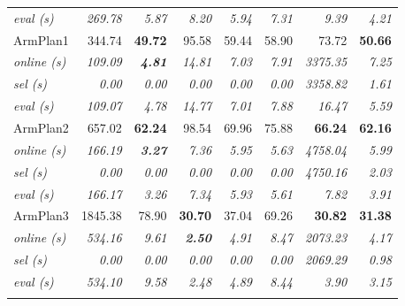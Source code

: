 \begin{figure}[t!]
{{\begin{tabular}{lrrrrrrr}
         \;\;\;\;\emph{eval (s)} & \emph{269.78} & \emph{5.87} & \emph{8.20} & \emph{5.94} & \emph{7.31} & \emph{9.39} & \emph{4.21} \\
         \addlinespace[0.3em]
         ArmPlan1 &  344.74 & \textbf{49.72} & 95.58 & 59.44 & 58.90 & 73.72 & \textbf{50.66} \\
         \;\;\emph{online (s)} & \emph{109.09} & \bf\emph{4.81} & \emph{14.81} & \emph{7.03} & \emph{7.91} & \emph{3375.35} & \emph{7.25} \\
         \;\;\;\;\emph{sel (s)} & \emph{0.00} & \emph{0.00} & \emph{0.00} & \emph{0.00} & \emph{0.00} & \emph{3358.82} & \emph{1.61} \\
         \;\;\;\;\emph{eval (s)} & \emph{109.07} & \emph{4.78} & \emph{14.77} & \emph{7.01} & \emph{7.88} & \emph{16.47} & \emph{5.59} \\
         \addlinespace[0.3em]
         ArmPlan2 &  657.02 & \textbf{62.24} & 98.54 & 69.96 & 75.88 & \textbf{66.24} & \textbf{62.16} \\
         \;\;\emph{online (s)} & \emph{166.19} & \bf\emph{3.27} & \emph{7.36} & \emph{5.95} & \emph{5.63} & \emph{4758.04} & \emph{5.99} \\
         \;\;\;\;\emph{sel (s)} & \emph{0.00} & \emph{0.00} & \emph{0.00} & \emph{0.00} & \emph{0.00} & \emph{4750.16} & \emph{2.03} \\
         \;\;\;\;\emph{eval (s)} & \emph{166.17} & \emph{3.26} & \emph{7.34} & \emph{5.93} & \emph{5.61} & \emph{7.82} & \emph{3.91} \\
         \addlinespace[0.3em]
         ArmPlan3 & 1845.38 & 78.90 & \textbf{30.70} & 37.04 & 69.26 & \textbf{30.82} & \textbf{31.38} \\
         \;\;\emph{online (s)} & \emph{534.16} & \emph{9.61} & \bf\emph{2.50} & \emph{4.91} & \emph{8.47} & \emph{2073.23} & \emph{4.17} \\
         \;\;\;\;\emph{sel (s)} & \emph{0.00} & \emph{0.00} & \emph{0.00} & \emph{0.00} & \emph{0.00} & \emph{2069.29} & \emph{0.98} \\
         \;\;\;\;\emph{eval (s)} & \emph{534.10} & \emph{9.58} & \emph{2.48} & \emph{4.89} & \emph{8.44} & \emph{3.90} & \emph{3.15} \\
         \addlinespace[0.15em]
         \bottomrule
      \end{tabular}%
      }%
      \label{subfig:table-results}
   }
   
   \vspace{0.1in}
   

\end{figure}
